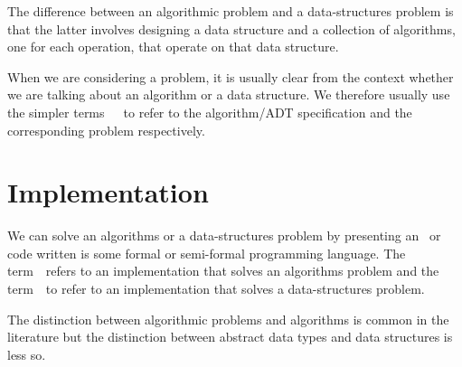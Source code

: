 \begin{cluster}
\label{grp:nt:introduction::spec::difference}

\begin{note}
\label{nt:introduction::spec::difference}
The difference between an algorithmic problem and a data-structures
problem is that the latter involves designing a data structure and a
collection of algorithms, one for each operation, that operate on that
data structure.

\end{note}
\end{cluster}

\begin{cluster}
\label{grp:rmrk:introduction::spec::considering}

\begin{remark}
\label{rmrk:introduction::spec::considering}
When we are considering a problem, it is usually clear from the context whether we are talking about an algorithm or a data structure.
We therefore usually use the simpler terms~~~to refer to the algorithm/ADT specification and the corresponding problem respectively.

\end{remark}
\end{cluster}


\section{Implementation}
\label{sec:introduction::spec::implementation}

\begin{cluster}
\label{grp:grm:introduction::spec::solve}

\begin{gram}
\label{grm:introduction::spec::solve}
We can solve an algorithms or a data-structures problem by presenting an~ or code written is some formal or semi-formal programming language.  
The term~~refers to an implementation that solves an algorithms problem and the term~~to refer to an implementation that solves a data-structures problem.

\end{gram}
\end{cluster}

\begin{cluster}
\label{grp:nt:introduction::spec::distinction}

\begin{note}
\label{nt:introduction::spec::distinction}
The distinction between algorithmic problems and algorithms is common
in the literature but the distinction between abstract data types and
data structures is less so.

\end{note}
\end{cluster}

